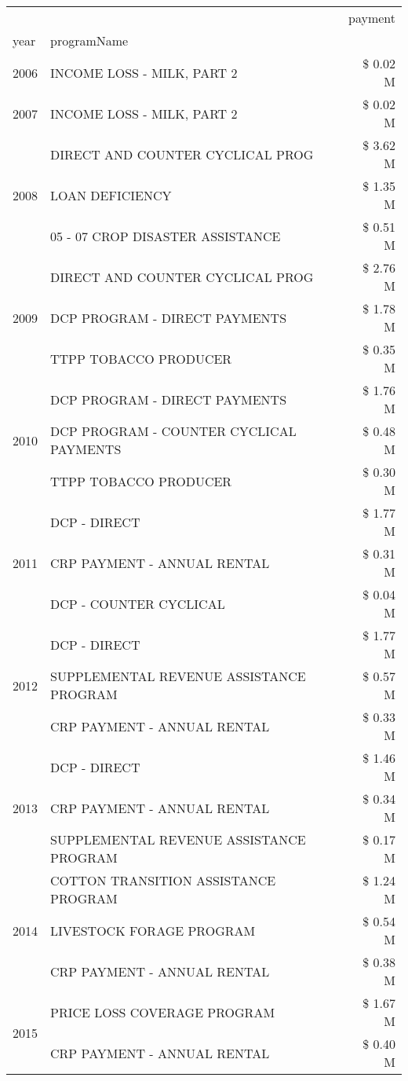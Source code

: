 \begin{tabular}{llr}
\toprule
 &  & payment \\
year & programName &  \\
\midrule
2006 & INCOME LOSS - MILK, PART 2 & \$ 0.02 M \\
\cline{1-3}
2007 & INCOME LOSS - MILK, PART 2 & \$ 0.02 M \\
\cline{1-3}
\multirow[t]{3}{*}{2008} & DIRECT AND COUNTER CYCLICAL PROG & \$ 3.62 M \\
 & LOAN DEFICIENCY & \$ 1.35 M \\
 & 05 - 07 CROP DISASTER ASSISTANCE & \$ 0.51 M \\
\cline{1-3}
\multirow[t]{3}{*}{2009} & DIRECT AND COUNTER CYCLICAL PROG & \$ 2.76 M \\
 & DCP PROGRAM - DIRECT PAYMENTS & \$ 1.78 M \\
 & TTPP TOBACCO PRODUCER & \$ 0.35 M \\
\cline{1-3}
\multirow[t]{3}{*}{2010} & DCP PROGRAM - DIRECT PAYMENTS & \$ 1.76 M \\
 & DCP PROGRAM - COUNTER CYCLICAL PAYMENTS & \$ 0.48 M \\
 & TTPP TOBACCO PRODUCER & \$ 0.30 M \\
\cline{1-3}
\multirow[t]{3}{*}{2011} & DCP - DIRECT & \$ 1.77 M \\
 & CRP PAYMENT - ANNUAL RENTAL & \$ 0.31 M \\
 & DCP - COUNTER CYCLICAL & \$ 0.04 M \\
\cline{1-3}
\multirow[t]{3}{*}{2012} & DCP - DIRECT & \$ 1.77 M \\
 & SUPPLEMENTAL REVENUE ASSISTANCE PROGRAM & \$ 0.57 M \\
 & CRP PAYMENT - ANNUAL RENTAL & \$ 0.33 M \\
\cline{1-3}
\multirow[t]{3}{*}{2013} & DCP - DIRECT & \$ 1.46 M \\
 & CRP PAYMENT - ANNUAL RENTAL & \$ 0.34 M \\
 & SUPPLEMENTAL REVENUE ASSISTANCE PROGRAM & \$ 0.17 M \\
\cline{1-3}
\multirow[t]{3}{*}{2014} & COTTON TRANSITION ASSISTANCE PROGRAM & \$ 1.24 M \\
 & LIVESTOCK FORAGE PROGRAM & \$ 0.54 M \\
 & CRP PAYMENT - ANNUAL RENTAL & \$ 0.38 M \\
\cline{1-3}
\multirow[t]{3}{*}{2015} & PRICE LOSS COVERAGE PROGRAM & \$ 1.67 M \\
 & CRP PAYMENT - ANNUAL RENTAL & \$ 0.40 M \\

\end{tabular}
